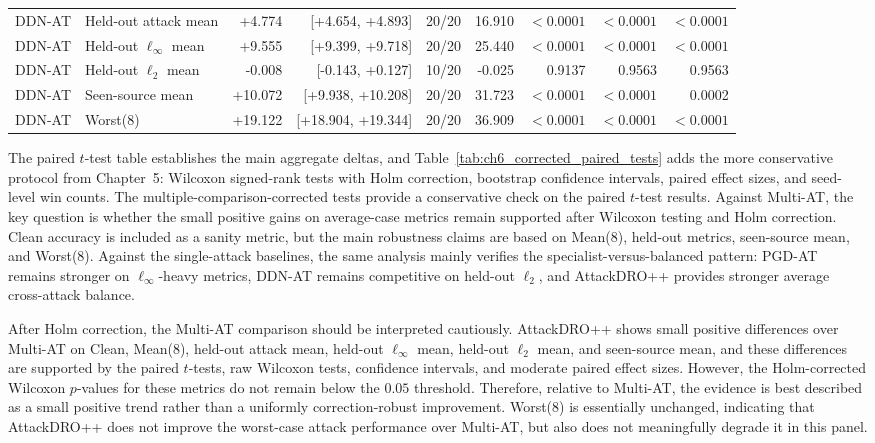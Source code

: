 \begin{table}[H]
{\begin{tabular}{llrrrrrrr}
DDN-AT & Held-out attack mean
& +4.774 & [+4.654, +4.893] & 20/20 & 16.910 & $<0.0001$ & $<0.0001$ & $<0.0001$ \\

DDN-AT & Held-out $\ell_\infty$ mean
& +9.555 & [+9.399, +9.718] & 20/20 & 25.440 & $<0.0001$ & $<0.0001$ & $<0.0001$ \\

DDN-AT & Held-out $\ell_2$ mean
& -0.008 & [-0.143, +0.127] & 10/20 & -0.025 & 0.9137 & 0.9563 & 0.9563 \\

DDN-AT & Seen-source mean
& +10.072 & [+9.938, +10.208] & 20/20 & 31.723 & $<0.0001$ & $<0.0001$ & 0.0002 \\

DDN-AT & Worst(8)
& +19.122 & [+18.904, +19.344] & 20/20 & 36.909 & $<0.0001$ & $<0.0001$ & $<0.0001$ \\

\bottomrule
\end{tabular}%
}
\end{table}

The paired $t$-test table establishes the main aggregate deltas, and
Table~\ref{tab:ch6_corrected_paired_tests} adds the more conservative protocol from
Chapter~5: Wilcoxon signed-rank tests with Holm correction, bootstrap confidence
intervals, paired effect sizes, and seed-level win counts.
The multiple-comparison-corrected tests provide a conservative check on the
paired $t$-test results. Against Multi-AT, the key question is whether the
small positive gains on average-case metrics remain supported after Wilcoxon
testing and Holm correction. Clean accuracy is included as a sanity metric, but
the main robustness claims are based on Mean(8), held-out metrics, seen-source mean, and
Worst(8). Against the single-attack baselines, the same analysis mainly verifies
the specialist-versus-balanced pattern: PGD-AT remains stronger on
$\ell_\infty$-heavy metrics, DDN-AT remains competitive on held-out $\ell_2$,
and AttackDRO++ provides stronger average cross-attack balance.

After Holm correction, the Multi-AT comparison should be interpreted cautiously.
AttackDRO++ shows small positive differences over Multi-AT on Clean, Mean(8),
held-out attack mean, held-out $\ell_\infty$ mean, held-out $\ell_2$ mean, and
seen-source mean, and these
differences are supported by the paired $t$-tests, raw Wilcoxon tests, confidence
intervals, and moderate paired effect sizes. However, the Holm-corrected
Wilcoxon $p$-values for these metrics do not remain below the $0.05$ threshold.
Therefore, relative to Multi-AT, the evidence is best described as a small
positive trend rather than a uniformly correction-robust improvement. Worst(8)
is essentially unchanged, indicating that AttackDRO++ does not improve
the worst-case attack performance over Multi-AT, but also does not meaningfully
degrade it in this panel.

